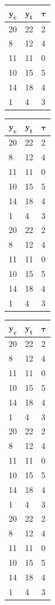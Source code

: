 \documentclass[12pt,leqno]{article}
\theoremstyle{newstyle}
\begin{document}
\begin{table}[H]
\scriptsize
\centering
\begin{tabular}{l|l|l}
$\mathbf{y_c}$ & $\mathbf{y_t}$ & $\pmb{\tau}$ \\ \midrule
20 & 22 &  2 \\
8  & 12 &  4 \\
11 & 11 &  0 \\
10 & 15 &  5 \\
14 & 18 &  4 \\
1  &  4 &  3
\end{tabular}
\hfill
\begin{tabular}{l|l|l}
$\mathbf{y_c}$ & $\mathbf{y_t}$ & $\pmb{\tau}$ \\ \midrule
20 & 22 &  2 \\
8  & 12 &  4 \\
11 & 11 &  0 \\
10 & 15 &  5 \\
14 & 18 &  4 \\
1  &  4 &  3 \\ \midrule
20 & 22 &  2 \\
8  & 12 &  4 \\
11 & 11 &  0 \\
10 & 15 &  5 \\
14 & 18 &  4 \\
1  &  4 &  3
\end{tabular}
\hfill
\begin{tabular}{l|l|l}
$\mathbf{y_c}$ & $\mathbf{y_t}$ & $\pmb{\tau}$ \\ \midrule
20 & 22 &  2 \\
8  & 12 &  4 \\
11 & 11 &  0 \\
10 & 15 &  5 \\
14 & 18 &  4 \\
1  &  4 &  3 \\ \midrule
20 & 22 &  2 \\
8  & 12 &  4 \\
11 & 11 &  0 \\
10 & 15 &  5 \\
14 & 18 &  4 \\
1  &  4 &  3 \\ \midrule
20 & 22 &  2 \\
8  & 12 &  4 \\
11 & 11 &  0 \\
10 & 15 &  5 \\
14 & 18 &  4 \\
1  &  4 &  3

\end{tabular}
\end{table}
\end{document}
